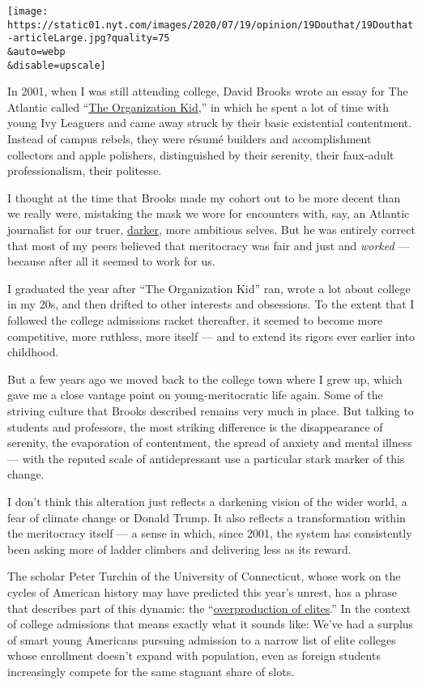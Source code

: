 \texttt{[image: https://static01.nyt.com/images/2020/07/19/opinion/19Douthat/19Douthat-articleLarge.jpg?quality=75\\\&auto=webp\\\&disable=upscale]}

In 2001, when I was still attending college, David Brooks wrote an essay
for The Atlantic called
``\href{https://www.theatlantic.com/magazine/archive/2001/04/the-organization-kid/302164/}{The
Organization Kid},'' in which he spent a lot of time with young Ivy
Leaguers and came away struck by their basic existential contentment.
Instead of campus rebels, they were résumé builders and accomplishment
collectors and apple polishers, distinguished by their serenity, their
faux-adult professionalism, their politesse.

I thought at the time that Brooks made my cohort out to be more decent
than we really were, mistaking the mask we wore for encounters with,
say, an Atlantic journalist for our truer,
\href{https://www.nationalreview.com/magazine/2010/10/18/film-what-makes-preppy-run/}{darker},
more ambitious selves. But he was entirely correct that most of my peers
believed that meritocracy was fair and just and \emph{worked} ---
because after all it seemed to work for us.

I graduated the year after ``The Organization Kid'' ran, wrote a lot
about college in my 20s, and then drifted to other interests and
obsessions. To the extent that I followed the college admissions racket
thereafter, it seemed to become more competitive, more ruthless, more
itself --- and to extend its rigors ever earlier into childhood.

But a few years ago we moved back to the college town where I grew up,
which gave me a close vantage point on young-meritocratic life again.
Some of the striving culture that Brooks described remains very much in
place. But talking to students and professors, the most striking
difference is the disappearance of serenity, the evaporation of
contentment, the spread of anxiety and mental illness --- with the
reputed scale of antidepressant use a particular stark marker of this
change.

I don't think this alteration just reflects a darkening vision of the
wider world, a fear of climate change or Donald Trump. It also reflects
a transformation within the meritocracy itself --- a sense in which,
since 2001, the system has consistently been asking more of ladder
climbers and delivering less as its reward.

The scholar Peter Turchin of the University of Connecticut, whose work
on the cycles of American history may have predicted this year's unrest,
has a phrase that describes part of this dynamic: the
``\href{http://peterturchin.com/age-of-discord/}{overproduction of
elites}.'' In the context of college admissions that means exactly what
it sounds like: We've had a surplus of smart young Americans pursuing
admission to a narrow list of elite colleges whose enrollment doesn't
expand with population, even as foreign students increasingly compete
for the same stagnant share of slots.

